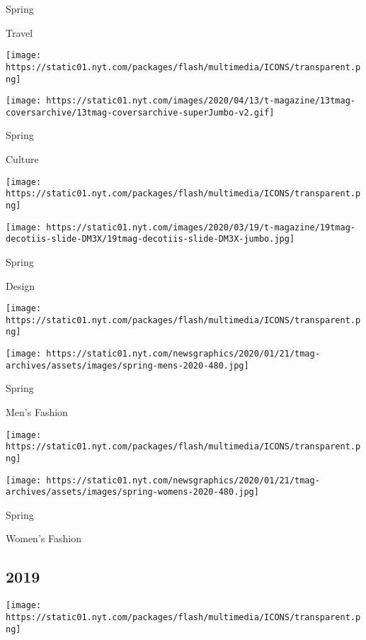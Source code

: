 Spring

Travel

\href{https://www.nytimes.com/issue/t-magazine/2020/04/12/ts-april-19-culture-issue}{}

\texttt{[image: https://static01.nyt.com/packages/flash/multimedia/ICONS/transparent.png]}

\texttt{[image: https://static01.nyt.com/images/2020/04/13/t-magazine/13tmag-coversarchive/13tmag-coversarchive-superJumbo-v2.gif]}

Spring

Culture

\href{https://www.nytimes.com/issue/t-magazine/2020/03/06/ts-march-22-design-issue}{}

\texttt{[image: https://static01.nyt.com/packages/flash/multimedia/ICONS/transparent.png]}

\texttt{[image: https://static01.nyt.com/images/2020/03/19/t-magazine/19tmag-decotiis-slide-DM3X/19tmag-decotiis-slide-DM3X-jumbo.jpg]}

Spring

Design

\href{https://www.nytimes.com/issue/t-magazine/2020/02/21/ts-march-8-mens-fashion-issue}{}

\texttt{[image: https://static01.nyt.com/packages/flash/multimedia/ICONS/transparent.png]}

\texttt{[image: https://static01.nyt.com/newsgraphics/2020/01/21/tmag-archives/assets/images/spring-mens-2020-480.jpg]}

Spring

Men's Fashion

\href{https://www.nytimes.com/issue/t-magazine/2020/02/06/ts-feb-23-womens-fashion-issue}{}

\texttt{[image: https://static01.nyt.com/packages/flash/multimedia/ICONS/transparent.png]}

\texttt{[image: https://static01.nyt.com/newsgraphics/2020/01/21/tmag-archives/assets/images/spring-womens-2020-480.jpg]}

Spring

Women's Fashion

\hypertarget{2019}{%
\subsection{2019}\label{2019}}

\href{https://www.nytimes.com/issue/t-magazine/2019/11/21/ts-dec-8-holiday-issue}{}

\texttt{[image: https://static01.nyt.com/packages/flash/multimedia/ICONS/transparent.png]}

